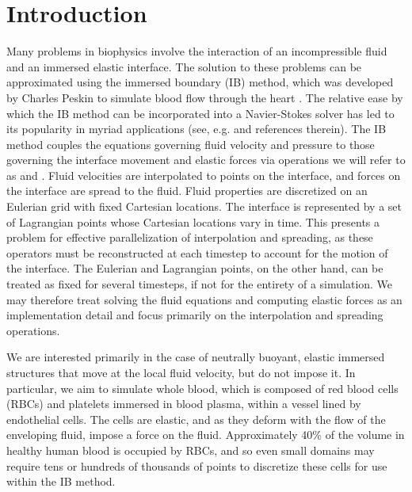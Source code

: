 \section{Introduction}

Many problems in biophysics involve the interaction of an incompressible fluid and an
immersed elastic interface. The solution to these problems can be approximated using the
immersed boundary (IB) method, which was developed by Charles Peskin to simulate blood
flow through the heart \cite{Peskin:1972wa}. The relative ease by which the IB method can
be incorporated into a Navier-Stokes solver has led to its popularity in myriad
applications (see, e.g. \cite{Iaccarino:2005ii,Griffith:2020hi} and references therein).
The IB method couples the equations governing fluid velocity and pressure to those
governing the interface movement and elastic forces via operations we will refer to as
 and . Fluid velocities are interpolated to points on
the interface, and forces on the interface are spread to the fluid. Fluid properties are
discretized on an Eulerian grid with fixed Cartesian locations. The interface is
represented by a set of Lagrangian points whose Cartesian locations vary in time. This
presents a problem for effective parallelization of interpolation and spreading, as these
operators must be reconstructed at each timestep to account for the motion of the
interface. The Eulerian and Lagrangian points, on the other hand, can be treated as fixed
for several timesteps, if not for the entirety of a simulation. We may therefore treat
solving the fluid equations and computing elastic forces as an implementation detail and
focus primarily on the interpolation and spreading operations.

We are interested primarily in the case of neutrally buoyant, elastic immersed structures
that move at the local fluid velocity, but do not impose it. In particular, we aim to
simulate whole blood, which is composed of red blood cells (RBCs) and platelets immersed
in blood plasma, within a vessel lined by endothelial cells. The cells are elastic, and
as they deform with the flow of the enveloping fluid, impose a force on the fluid.
Approximately 40\% of the volume in healthy human blood is occupied by RBCs, and so even
small domains may require tens or hundreds of thousands of points to discretize these
cells for use within the IB method.

